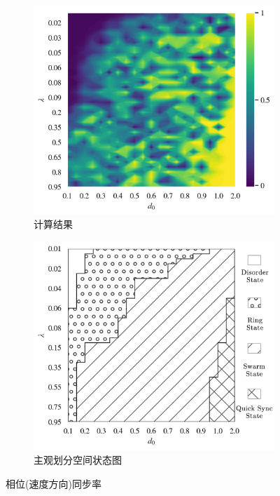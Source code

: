 \documentclass{article}
\begin{document}
\begin{figure}[H]
	\centering
	\begin{subfigure}[b]{0.49\textwidth}
		\includegraphics[width=\textwidth]{./figs/phaseSyncOp.png}
		\vspace{-1cm}
		\caption{计算结果}
	\end{subfigure}
	\begin{subfigure}[b]{0.49\textwidth}
		\includegraphics[width=\textwidth]{./figs/subjectiveOp3.png}
		\vspace{-1cm}
		\caption{主观划分空间状态图}
	\end{subfigure}
	\vspace{-0.5cm}
	\caption{相位(速度方向)同步率}
	\label{fig:fig234c.1}
\end{figure}
\end{document}
